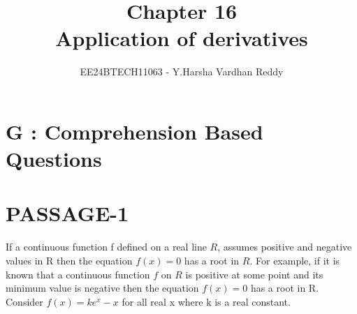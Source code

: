 \documentclass[journal,,12pt,twocolumn]{IEEEtran}
\theoremstyle{remark}
\begin{document}

\vspace{3cm}

\title{Chapter 16\\Application of derivatives}
\author{EE24BTECH11063 - Y.Harsha Vardhan Reddy}
\maketitle
\newpage
\bigskip

\renewcommand{\thefigure}{\theenumi}
\renewcommand{\thetable}{\theenumi}

\section*{G : Comprehension Based Questions}
\section*{PASSAGE-1}
If a continuous function f defined on a real line $R$, assumes positive and negative values in R then the equation $f(x)=0$ has a root in $R$. For example, if it is known that a continuous function $f$ on $R$ is positive at some point and its minimum value is negative then the equation $f(x)=0$ has a root in R.\\
Consider $f(x)=ke^x-x$ for all real x where k is a real constant.
\end{document}
